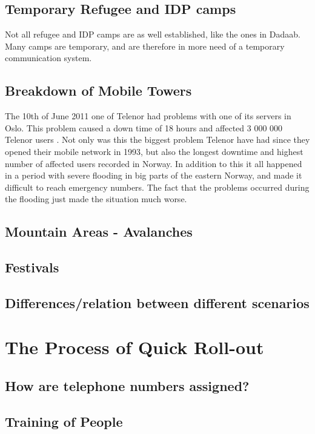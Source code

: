 \subsection{Temporary Refugee and IDP camps}
Not all refugee and IDP camps are as well established, like the ones in Dadaab. Many camps are temporary, and are therefore in more need of a temporary communication system. 

\subsection{Breakdown of Mobile Towers}


The 10th of June 2011 one of Telenor had problems with one of its servers in Oslo. This problem caused a down time of 18 hours and affected 3 000 000 Telenor users \cite{listeNedetid}. Not only was this the biggest problem Telenor have had since they opened their mobile network in 1993, but also the longest downtime and highest number of affected users recorded in Norway. In addition to this it all happened in a period with severe flooding in big parts of the eastern Norway, and made it difficult to reach emergency numbers. The fact that the problems occurred during the flooding just made the situation much worse. \cite{TelenorNede}

\subsection{Mountain Areas - Avalanches}

\subsection{Festivals}

\subsection{Differences/relation between different scenarios}




\section{The Process of Quick Roll-out}

\subsection{How are telephone numbers assigned?}

\subsection{Training of People}
